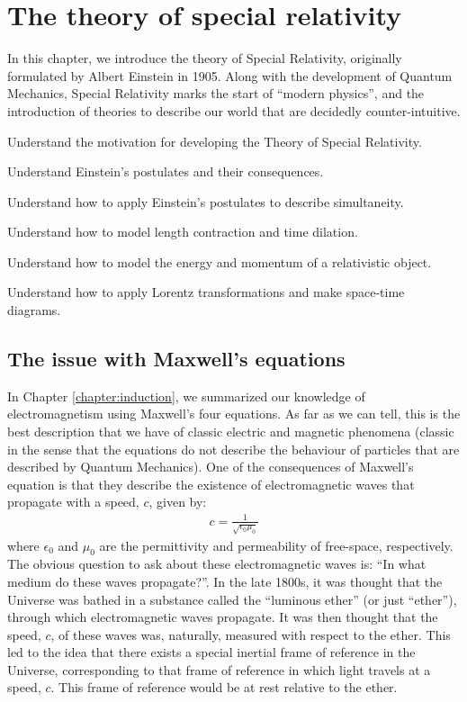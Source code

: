 \chapter{The theory of special relativity}
\label{chap:specialrelativity}
In this chapter, we introduce the theory of Special Relativity, originally formulated by Albert Einstein in 1905. Along with the development of Quantum Mechanics, Special Relativity marks the start of ``modern physics'', and the introduction of theories to describe our world that are decidedly counter-intuitive. 
 \vspace{1cm}
\begin{learningObjectives}
{
\item Understand the motivation for developing the Theory of Special Relativity.
\item Understand Einstein's postulates and their consequences.
\item Understand how to apply Einstein's postulates to describe simultaneity.
\item Understand how to model length contraction and time dilation.
\item Understand how to model the energy and momentum of a relativistic object.
\item Understand how to apply Lorentz transformations and make space-time diagrams.
}
\end{learningObjectives}

\section{The issue with Maxwell's equations}
In Chapter \ref{chapter:induction}, we summarized our knowledge of electromagnetism using Maxwell's four equations. As far as we can tell, this is the best description that we have of classic electric and magnetic phenomena (classic in the sense that the equations do not describe the behaviour of particles that are described by Quantum Mechanics). One of the consequences of Maxwell's equation is that they describe the existence of electromagnetic waves that propagate with a speed, $c$, given by:
\begin{align*}
c = \frac{1}{\sqrt{\epsilon_0\mu_0}}
\end{align*} 
where $\epsilon_0$ and $\mu_0$ are the permittivity and permeability of free-space, respectively. The obvious question to ask about these electromagnetic waves is: ``In what medium do these waves propagate?''. In the late 1800s, it was thought that the Universe was bathed in a substance called the ``luminous ether'' (or just ``ether''), through which electromagnetic waves propagate. It was then thought that the speed, $c$, of these waves was, naturally, measured with respect to the ether. This led to the idea that there exists a special inertial frame of reference in the Universe, corresponding to that frame of reference in which light travels at a speed, $c$. This frame of reference would be at rest relative to the ether.

